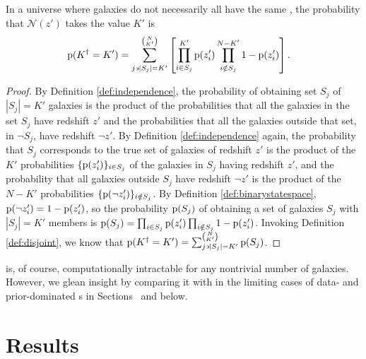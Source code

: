 \begin{lemma}\label{lem:unique} 
	In a universe where galaxies do not necessarily all have the same \pzpdf, the probability that $\mathcal{N}(z')$ takes the value $K'$ is 
	\begin{align}
	\eqlabel{eqn:general}
	\pr{K^{\dagger} = K'} &= \sum_{j \backepsilon |S_{j}| = K'}^{\binom{N}{K'}} \left[ \prod_{i \in S_{j}}^{K'} \pr{z'_{i}} \prod_{i \notin S_{j}}^{N - K'} 1 - \pr{z'_{i}} \right] .
	\end{align}
\end{lemma}
\begin{proof}
	By Definition \ref{def:independence}, the probability of obtaining set $S_{j}$ of ${|S_{j}| = K'}$ galaxies is the product of the probabilities that all the galaxies in the set $S_{j}$ have redshift $z'$ and the probabilities that all the galaxies outside that set, in $\lnot S_{j}$, have redshift $\lnot z'$.
	By Definition \ref{def:independence} again, the probability that $S_{j}$ corresponds to the true set of galaxies of redshift $z'$ is the product of the $K'$ probabilities ${\{\mathrm{p}(z'_{i})\}_{i \in S_{j}}}$ of the galaxies in $S_{j}$ having redshift $z'$, and the probability that all galaxies outside $S_{j}$ have redshift $\lnot z'$ is the product of the $N - K'$ probabilities ${\{\mathrm{p}(\lnot z'_{i})\}_{i \notin S_{j}}}$.
	By Definition \ref{def:binarystatespace}, $\mathrm{p}(\lnot z'_{i}) = 1 - \mathrm{p}(z'_{i})$, so the probability $\mathrm{p}(S_{j})$ of obtaining a set of galaxies $S_{j}$ with ${|S_{j}| = K'}$ members is ${\mathrm{p}(S_{j}) = {\prod_{i \in S_{j}} \mathrm{p}(z'_{i}) \prod_{i \notin S_{j}} 1 - \mathrm{p}(z'_{i})}}$.
	Invoking Definition \ref{def:disjoint}, we know that ${\mathrm{p}(K^{\dagger} = K') = \sum_{j \backepsilon |S_{j}| = K'}^{\binom{N}{K'}} \mathrm{p}(S_{j})}$.
\end{proof}

 is, of course, computationally intractable for any nontrivial number of galaxies.
However, we glean insight by comparing it with  in the limiting cases of data- and prior-dominated \pzpdf s in Sections~ and  below.

\section{Results}


